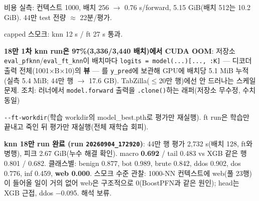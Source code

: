 \par\noindent \textbullet\enspace 비용 실측: 컨텍스트 1000, 배치 256  \ensuremath{\rightarrow}  0.76 s/\allowbreak{}forward, 5.15 GiB(배치 512는 10.2 GiB). 44만 test 전량 \ensuremath{\approx} 22분/\allowbreak{}평가.


\par\noindent \textbullet\enspace capped 스모크: knn 12 s /\allowbreak{} ft 27 s 통과.


\par\noindent \textbullet\enspace \textbf{18만 1차 knn run은 97\%(3,336/\allowbreak{}3,440 배치)에서 CUDA OOM}: 저장소 \texttt{eval\_\allowbreak{}\allowbreak{}pfk\allowbreak{}nn}/\allowbreak{}\texttt{eval\_\allowbreak{}\allowbreak{}ft\_\allowbreak{}\allowbreak{}knn}이 배치마다 \texttt{logits =\allowbreak{}\allowbreak{} model(.\allowbreak{}.\allowbreak{}.\allowbreak{})[.\allowbreak{}.\allowbreak{}.\allowbreak{},\allowbreak{} :K]} — 디코더 출력 전체(1001×B×10)의 \textbf{뷰} — 를 \texttt{y\_\allowbreak{}\allowbreak{}pred}에 보관해 GPU에 배치당 5.1 MiB 누적(실측 5.4 MiB; 44만 행  \ensuremath{\rightarrow}  17.6 GB). TabZilla(\ensuremath{\leq}20만 행)에선 안 드러나는 스케일 문제. 조치: 러너에서 \texttt{model.\allowbreak{}fo\allowbreak{}rward} 출력을 \texttt{.\allowbreak{}clone()\allowbreak{}}하는 래퍼(저장소 무수정, 수치 동일)

\par\noindent \textbullet\enspace \texttt{-\allowbreak{}-\allowbreak{}ft-\allowbreak{}wor\allowbreak{}kdir}(학습 workdir의 model\_\allowbreak{}best.pth로 평가만 재실행). ft run은 학습만 끝내고 죽인 뒤 평가만 재실행(전체 재학습 회피).



\par\noindent \textbullet\enspace \textbf{knn 18만 run 완료 (run \texttt{20260904\allowbreak{}\_\allowbreak{}\allowbreak{}172920})}: 44만 행 평가 2,732 s(배치 128, ft와 병행), 피크 2.67 GiB(누수 해결 확인). macro \textbf{0.692} /\allowbreak{} tail 0.483 vs XGB 같은 행 0.801 /\allowbreak{} 0.682. 클래스별: benign 0.877, bot 0.989, brute 0.842, ddos 0.902, dos 0.776, inf 0.459, \textbf{web 0.000}. 스모크 수준 관찰: 1000-NN 컨텍스트에 web(풀 23행)이 들어올 일이 거의 없어 web은 구조적으로 0(BoostPFN과 같은 원인); head는 XGB 근접, ddos −0.095. 해석 보류.


